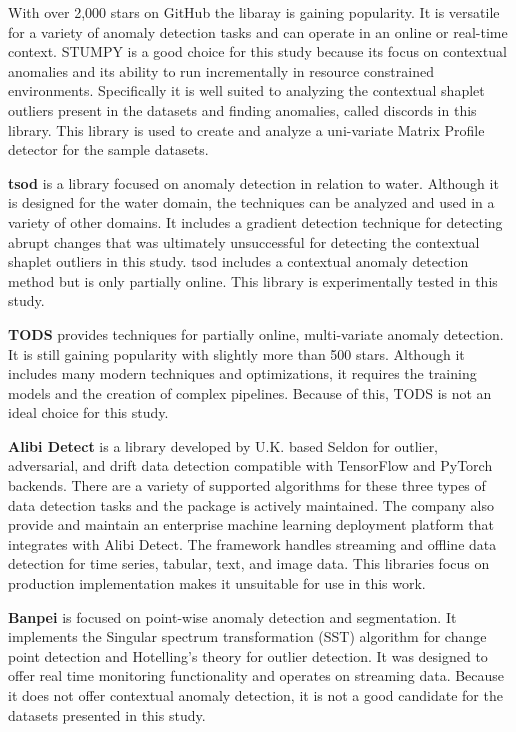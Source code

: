 With over 2,000 stars on GitHub the libaray is gaining popularity. It is versatile for a variety of anomaly detection tasks and can operate in an online or real-time context. STUMPY is a good choice for this study because its focus on contextual anomalies and its ability to run incrementally in resource constrained environments. Specifically it is well suited to analyzing the contextual shaplet  outliers present in the datasets and finding anomalies, called discords in this library. This library is used to create and analyze a uni-variate Matrix Profile detector for the sample datasets. 

\textbf{tsod} \parencite{tsod} is a library focused on anomaly detection in relation to water. Although it is designed for the water domain, the techniques can be analyzed and used in a variety of other domains. It includes a gradient detection technique for detecting abrupt changes that was ultimately unsuccessful for detecting the contextual shaplet outliers in this study. tsod includes a contextual anomaly detection method but is only partially online. This library is experimentally tested in this study.

\textbf{TODS} \parencite{Lai_2021_TODS} provides techniques for partially online, multi-variate anomaly detection. It is still gaining popularity with slightly more than 500 stars. Although it includes many modern techniques and optimizations, it requires the training models and the creation of complex pipelines. Because of this, TODS is not an ideal choice for this study.

\textbf{Alibi Detect} \parencite{alibi-detect} is a library developed by U.K. based Seldon for outlier, adversarial, and drift data detection compatible with TensorFlow and PyTorch backends. There are a variety of supported algorithms for these three types of data detection tasks and the package is actively maintained. The company also provide and maintain an enterprise machine learning deployment platform that integrates with Alibi Detect. The framework handles streaming and offline data detection for time series, tabular, text, and image data. This libraries focus on production implementation makes it unsuitable for use in this work.

\textbf{Banpei} \parencite{banpei} is focused on point-wise anomaly detection and segmentation.
It implements the Singular spectrum transformation (SST) algorithm for change point detection and Hotelling's theory for outlier detection. It was designed to offer real time monitoring functionality and operates on streaming data. Because it does not offer contextual anomaly detection, it is not a good candidate for the datasets presented in this study.

